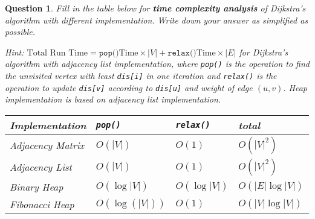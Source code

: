 \documentclass[10.5pt]{article}
\newtheorem{Q}{Question}
\begin{document}
\begin{Q}
	Fill in the table below for \textbf{time complexity analysis} of Dijkstra’s algorithm with different implementation. Write down your answer as simplified as possible.

	\textit{Hint: $\text{Total Run Time} = \texttt{pop()}\text{Time} \times |V| + \texttt{relax()}\text{Time} \times |E|$ for Dijkstra’s algorithm with adjacency list implementation, where \texttt{pop()} is the operation to find the unvisited vertex with least \texttt{dis[i]} in one iteration and \texttt{relax()} is the operation to update \texttt{dis[v]} according to \texttt{dis[u]} and weight of edge $(u, v)$. Heap implementation is based on adjacency list implementation.}
	\begin{table}[htbp]
		\begin{center}
			\begin{tabular}{|l|p{3cm}<{\centering}|p{3cm}<{\centering}| p{3cm}<{\centering}|}
				\hline
				Implementation   & \texttt{pop()} & \texttt{relax()} & total           \\ \hline
				Adjacency Matrix & $O(|V|)$       & $O(1)$           & $O(|V|^2)$      \\ \hline
				Adjacency List   & $O(|V|)$       & $O(1)$           & $O(|V|^2)$      \\ \hline
				Binary Heap      & $O(\log|V|)$   & $O(\log|V|)$     & $O(|E|\log|V|)$ \\ \hline
				Fibonacci Heap   & $O(\log(|V|))$ & $O(1)$           & $O(|V|\log|V|)$ \\ \hline
			\end{tabular}
		\end{center}
	\end{table}
\end{Q}

\pagebreak
\end{document}
